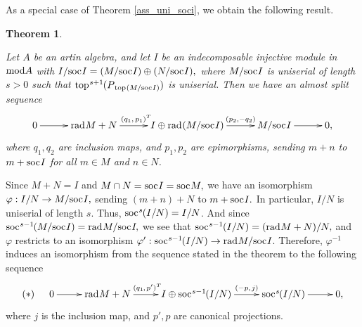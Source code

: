 \documentclass[10pt]{amsart}
\newtheorem{Theo}{Theorem}[subsection]
\theoremstyle{definition}
\newtheorem{Remark}[Theo]{Remark}
\newcommand{\mmod}{{\rm mod}}
\newcommand{\rad}{{\rm rad}\hspace{.5pt}}
\newcommand{\soc}{{\rm soc}\hspace{.5pt}}
\newcommand{\ntop}{{\rm top}\hspace{.5pt}}
\begin{document}

\smallskip

As a special case of Theorem \ref{ass_uni_soci}, we obtain the following result. %

\begin{Theo}\label{ass_st_mod_1}

Let $A$ be an artin algebra, and let $I$ be an indecomposable injective module in $\mmod A$ with $I/\soc I=(M/\soc I) \oplus (N/\soc I),$ where $M/\soc I$ is uniserial of length $s>0$ such that $\ntop^{s+1}\hspace{-.5pt}(P_{\,\ntop (M/\soc I)})$ is uniserial. Then we have an almost split sequence \vspace{-9.5pt}
$$\xymatrixcolsep{28pt}\xymatrix{
0 \ar[r] & \rad M + N \ar[r]^-{(q_1, \,p_1)^T\hspace{-5pt}}& I \oplus \rad (M/\soc I) \ar[r]^-{(p_2, -q_2)} & M/\soc I \ar[r] & 0,
}\vspace{-5pt}$$ where $q_1, q_2$ are inclusion maps, and $p_1, p_2$ are epimorphisms, sending $m+n$ to $m+\soc I$ for all $m\in M$ and $n\in N$.

\end{Theo}

\vspace{-1.5pt}

 Since $M+N=I$ and $M\cap N=\soc I=\soc M,$ we have an isomorphism $\varphi: I/N\to M/\soc I,$ sending $(m+n)+N$ to $m+\soc I.$ In particular, $I/N$ is uniserial of length $s$. Thus, $\soc^s\hspace{-.5pt}(I/N)=I/N$. And since $\soc^{s-1}\hspace{-.8pt}(M/\soc I)=\rad M/\soc I\hspace{-1pt},$ we see that $\hspace{.5pt}\soc^{s-1}\hspace{-.5pt}(I/N)=(\rad M + N)/N,$ and  $\varphi$ restricts to an isomorphism $\varphi': \soc^{s-1}\hspace{-.8pt}(I/N)\to \rad M/\soc I$. Therefore, $\varphi^{-1}$ induces an isomorphism from the sequence stated in the theorem to the following sequence \vspace{-6.5pt} $$\xymatrixcolsep{25pt}\xymatrix{(*) \hspace{15pt} 0\ar[r] & \rad M +N \ar[r]^-{(q_1\hspace{-.5pt}, \hspace{1pt} p')^T\hspace{-3pt}} & I \oplus \soc^{s-1}\hspace{-.8pt}(I/N) \ar[r]^-{(-p, \hspace{1pt} j)} & \soc^{s}\hspace{-.8pt}(I/N) \ar[r] & 0,}\vspace{-5.5pt}$$ where $j$ is the inclusion map, and $p', p$ are canonical projections. 
\end{document}
